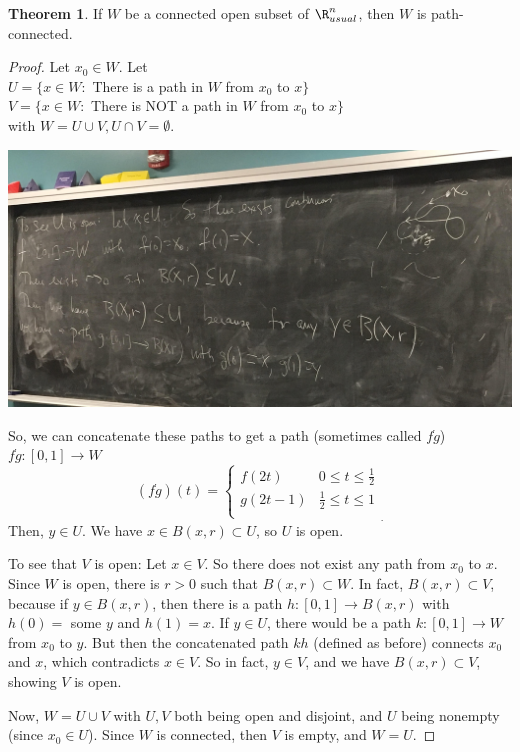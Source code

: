 \documentclass[a5paper]{article}
\theoremstyle{definition}%
\newtheorem{theorem}{Theorem}
\numberwithin{exercise}{section}
\theoremstyle{remark}%
\begin{document}
\begin{highlight}
\begin{theorem}
If $W$ be a connected open subset of $\R^n_{usual}$, then $W$ is path-connected. 
\end{theorem}
\end{highlight}
\begin{proof}
Let $x_0\in W$. Let\\
$U=\{x\in W:$ There is a path in $W$ from $x_0$ to $x\}$\\
$V=\{x\in W:$ There is NOT a path in $W$ from $x_0$ to $x\}$\\
with $W=U\cup V, U\cap V=\emptyset$. 

\begin{center}
\includegraphics[scale=.08]{images/path_connectedness1}
\end{center}

So, we can concatenate these paths to get a path (sometimes called $f\dot g$)  $f\dot g: [0,1]\to W$
$$(f\dot g)(t) = 
\begin{cases}
f(2t) & 0\leq t\leq \frac{1}{2}\\
g(2t-1) & \frac{1}{2}\leq t\leq 1\\
\end{cases}_.$$
Then, $y\in U$. We have $x\in B(x,r)\subset U$, so $U$ is open. 

To see that $V$ is open: Let $x\in V$. So there does not exist any path from $x_0$ to $x$. Since $W$ is open, there is $r>0$ such that $B(x,r)\subset W$. In fact, $B(x,r)\subset V$, because if $y\in B(x,r)$, then there is a path $h:[0,1]\to B(x,r)$ with $h(0)=$ some $y$ and $h(1)=x$. If $y\in U$, there would be a path $k:[0,1]\to W$ from $x_0$ to $y$. But then the concatenated path $kh$ (defined as before) connects $x_0$ and $x$, which contradicts $x\in V$. So in fact, $y\in V$, and we have $B(x,r)\subset V$, showing $V$ is open. 

Now, $W=U\cup V$ with $U,V$ both being open and disjoint, and $U$ being nonempty (since $x_0\in U$). Since $W$ is connected, then $V$ is empty, and $W=U$. 

\end{proof}
\end{document}
